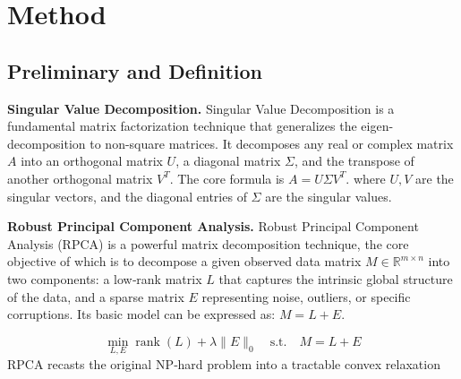 \documentclass[runningheads]{llncs}
\begin{document}
\section{Method}
\label{sec:method}
\subsection{Preliminary and Definition}
\noindent\textbf{Singular Value Decomposition.} Singular Value Decomposition is a fundamental matrix factorization technique that generalizes the eigen-decomposition to non-square matrices\cite{SVD}. It decomposes any real or complex matrix $A$ into an orthogonal matrix $U$, a diagonal matrix $\Sigma$, and the transpose of another orthogonal matrix $V^T$. The core formula is $A = U \Sigma V^T$.
where $U,V$ are the singular vectors, and the diagonal entries of $\Sigma$ are the singular values. 

\noindent\textbf{Robust Principal Component Analysis.} Robust Principal Component Analysis (RPCA) is a powerful matrix decomposition technique\cite{RPCA}, the core objective of which is to decompose a given observed data matrix $M \in \mathbb{R}^{m \times n}$ into two components: a low‑rank matrix $L$ that captures the intrinsic global structure of the data, and a sparse matrix $E$ representing noise, outliers, or specific corruptions. Its basic model can be expressed as: $M=L+E$.

\begin{equation}
    \min_{L, E} \operatorname{rank}(L) + \lambda \|E\|_0 \quad \text{s.t.} \quad M = L + E \label{eq:RPCA-origin}
\end{equation}
RPCA recasts the original NP‑hard problem into a tractable convex relaxation
\end{document}
